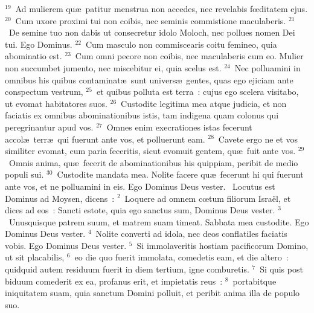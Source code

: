 ${}^{19}$~Ad mulierem qu\ae\ patitur menstrua non accedes, nec revelabis fœditatem ejus.
${}^{20}$~Cum uxore proximi tui non coibis, nec seminis commistione maculaberis.
${}^{21}$~De semine tuo non dabis ut consecretur idolo Moloch, nec pollues nomen Dei tui. Ego Dominus.
${}^{22}$~Cum masculo non commiscearis coitu femineo, quia abominatio est.
${}^{23}$~Cum omni pecore non coibis, nec maculaberis cum eo. Mulier non succumbet jumento, nec miscebitur ei, quia scelus est.
${}^{24}$~Nec polluamini in omnibus his quibus contaminat\ae\ sunt univers\ae\ gentes, quas ego ejiciam ante conspectum vestrum,
${}^{25}$~et quibus polluta est terra~: cujus ego scelera visitabo, ut evomat habitatores suos.
${}^{26}$~Custodite legitima mea atque judicia, et non faciatis ex omnibus abominationibus istis, tam indigena quam colonus qui peregrinantur apud vos.
${}^{27}$~Omnes enim execrationes istas fecerunt accol\ae\ terr\ae\ qui fuerunt ante vos, et polluerunt eam.
${}^{28}$~Cavete ergo ne et vos similiter evomat, cum paria feceritis, sicut evomuit gentem, qu\ae\ fuit ante vos.
${}^{29}$~Omnis anima, qu\ae\ fecerit de abominationibus his quippiam, peribit de medio populi sui.
${}^{30}$~Custodite mandata mea. Nolite facere qu\ae\ fecerunt hi qui fuerunt ante vos, et ne polluamini in eis. Ego Dominus Deus vester.
~\lettrine[lines=10,image=true,loversize=0.05,lraise=-0.03]{L}{}ocutus est Dominus ad Moysen, dicens~:
${}^{2}$~Loquere ad omnem cœtum filiorum Isra\"el, et dices ad eos~: Sancti estote, quia ego sanctus sum, Dominus Deus vester.
${}^{3}$~Unusquisque patrem suum, et matrem suam timeat. Sabbata mea custodite. Ego Dominus Deus vester.
${}^{4}$~Nolite converti ad idola, nec deos conflatiles faciatis vobis. Ego Dominus Deus vester.
${}^{5}$~Si immolaveritis hostiam pacificorum Domino, ut sit placabilis,
${}^{6}$~eo die quo fuerit immolata, comedetis eam, et die altero~: quidquid autem residuum fuerit in diem tertium, igne comburetis.
${}^{7}$~Si quis post biduum comederit ex ea, profanus erit, et impietatis reus~:
${}^{8}$~portabitque iniquitatem suam, quia sanctum Domini polluit, et peribit anima illa de populo suo.


